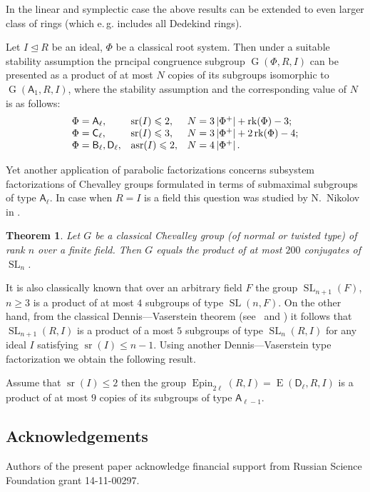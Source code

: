 \documentclass[12pt]{amsart}
\theoremstyle{plain} \declaretheorem[name=Theorem, Refname={Theorem,Theorems}]{thm} \Crefname{thm}{Theorem}{Theorems}
\numberwithin{equation}{section}
\newtheorem*{thm*}{Theorem}
\theoremstyle{definition} \newtheorem{dfn}[lemma]{Definition} \Crefname{dfn}{Definition}{Definitions}
\theoremstyle{remark} \newtheorem{rem}[lemma]{Remark} \Crefname{rem}{Remark}{Remarks}
\DeclareMathOperator{\G}{G}
\DeclareMathOperator{\SL}{SL}
\DeclareMathOperator{\E}{E}
\DeclareMathOperator{\sr}{sr}
\DeclareMathOperator{\Epin}{Epin}
\DeclareMathOperator{\asr}{asr}
\DeclareMathOperator{\rk}{rk}
\newcommand{\rA}{\mathsf{A}}
\newcommand{\rB}{\mathsf{B}}
\newcommand{\rC}{\mathsf{C}}
\newcommand{\rD}{\mathsf{D}}
\begin{document}
In the linear and symplectic case the above results can be extended to even larger class of rings (which e.\,g. includes all Dedekind rings).
\begin{thm}\label{thm:SL2width}
Let $I\trianglelefteq R$ be an ideal, $\Phi$ be a classical root system. Then under a suitable stability assumption the prncipal congruence subgroup $\G(\Phi,R,I)$ can be presented as a product of at most $N$ copies of its subgroups isomorphic to $\G(\rA_1,R,I)$, where the stability assumption and the corresponding value of $N$ is as follows:
\[\begin{array}{l@{\quad}l@{\quad}l}
\Phi=\rA_\ell, & \sr(I)\leqslant 2, & N=3\left|\Phi^+\right|+\rk(\Phi) - 3; \\
\Phi=\rC_\ell, & \sr(I)\leqslant 3, & N=3\left|\Phi^+\right|+2\rk(\Phi) - 4; \\
\Phi=\rB_\ell,\rD_\ell, & \asr(I)\leqslant 2, & N=4\left|\Phi^+\right|.
\end{array}\]
\end{thm}

Yet another application of parabolic factorizations concerns subsystem factorizations of Chevalley groups formulated in terms of submaximal subgroups of type $\rA_\ell$.
In case when $R=I$ is a field this question was studied by N.~Nikolov in \cite{NikProdDecomp}. 
\begin{thm*} Let $G$ be a classical Chevalley group (of normal or twisted type) of rank $n$ over a finite field.
Then $G$ equals the product of at most $200$ conjugates of $\SL_n$. \end{thm*}

It is also classically known that over an arbitrary field $F$ the group $\SL_{n+1}(F)$, $n\geq 3$ is a product of at most $4$ subgroups of type $\SL(n, F)$.
On the other hand, from the classical Dennis---Vaserstein theorem (see~\cite{Va69} and \cite[Lemma~2.1]{ST76})
it follows that $\SL_{n+1}(R, I)$ is a product of a most $5$ subgroups of type $\SL_n(R, I)$ for any ideal $I$ satisfying $\sr(I)\leqslant n-1$.
Using another Dennis---Vaserstein type factorization we obtain the following result.
\begin{thm}\label{thm:spin-sln-prod}
Assume that $\sr(I) \leqslant 2$ then the group $\Epin_{2\ell}(R, I)=\E(\rD_\ell, R, I)$ is a product of at most $9$ copies of its subgroups of type $\rA_{\ell-1}$.
\end{thm}

\subsection{Acknowledgements}
Authors of the present paper acknowledge financial support from Russian Science Foundation grant 14-11-00297.
\end{document}
